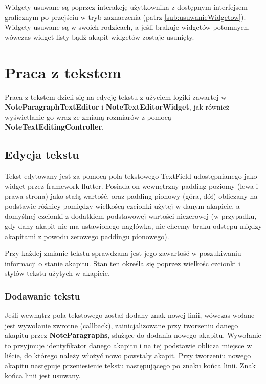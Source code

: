 Widgety usuwane są poprzez interakcję użytkownika z dostępnym interfejsem graficznym po przejściu w tryb zaznaczenia (patrz \ref{sub:usuwanieWidgetow}). Widgety usuwane są w swoich rodzicach, a jeśli brakuje widgetów potomnych, wówczas widget listy bądź akapit widgetów zostaje usunięty.

\section{Praca z tekstem}

Praca z tekstem dzieli się na edycję tekstu z użyciem logiki zawartej w \textbf{NoteParagraphTextEditor} i \textbf{NoteTextEditorWidget}, jak również wyświetlanie go wraz ze zmianą rozmiarów z pomocą \textbf{NoteTextEditingController}.

\subsection{Edycja tekstu}

Tekst edytowany jest za pomocą pola tekstowego TextField udostępnianego jako widget przez framework flutter. Posiada on wewnętrzny padding poziomy (lewa i prawa strona) jako stałą wartość, oraz padding pionowy (góra, dół) obliczany na podstawie różnicy pomiędzy wielkoścą czcionki użytej w danym akapicie, a domyślnej czcionki z dodatkiem podstawowej wartości niezerowej (w przypadku, gdy dany akapit nie ma ustawionego nagłówka, nie chcemy braku odstępu między akapitami z powodu zerowego paddingu pionowego).

Przy każdej zmianie tekstu sprawdzana jest jego zawartość w poszukiwaniu informacji o stanie akapitu. Stan ten określa się poprzez wielkośc czcionki i stylów tekstu użytych w akapicie.

\subsubsection{Dodawanie tekstu}

Jeśli wewnątrz pola tekstowego został dodany znak nowej linii, wówczas wołane jest wywołanie zwrotne (callback), zainicjalizowane przy tworzeniu danego akapitu przez \textbf{NoteParagraphs}, służące do dodania nowego akapitu. Wywołanie to przyjmuje identyfikator danego akapitu i na tej podstawie oblicza miejsce w liście, do którego należy włożyć nowo powstały akapit. Przy tworzeniu nowego akapitu następuje przeniesienie tekstu następującego po znaku końca linii. Znak końca linii jest usuwany.


